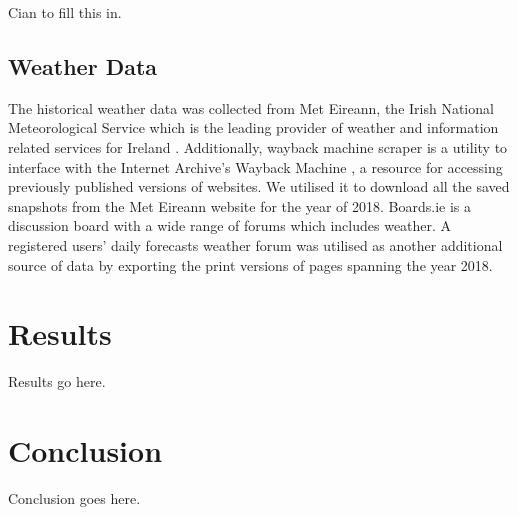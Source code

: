 \documentclass[a4paper,10pt]{article}
\begin{document}
Cian to fill this in.

\subsection{Weather Data}

The historical weather data was collected from Met Eireann, the Irish National Meteorological Service which is the leading provider of weather and information related services for Ireland . Additionally, wayback machine scraper  is a utility to interface with the Internet Archive's Wayback Machine , a resource for accessing previously published versions of websites. We utilised it to download all the saved snapshots from the Met Eireann website for the year of 2018. Boards.ie is a discussion board with a wide range of forums which includes weather. A registered users’ daily forecasts weather forum  was utilised as another additional source of data by exporting the print versions of pages spanning the year 2018.


\section{Results}

Results go here.

\section{Conclusion}

Conclusion goes here.
\end{document}
